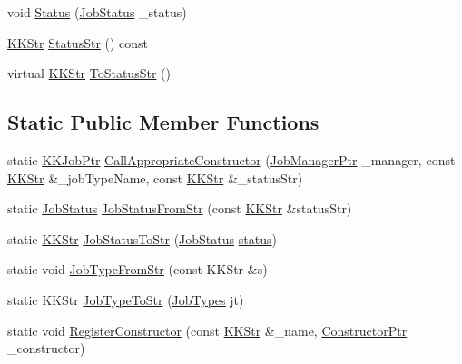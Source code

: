\begin{DoxyCompactItemize}
\item 
void \hyperlink{class_k_k_job_managment_1_1_k_k_job_ad21e08efa5fbb8a71f53accbb43fdeba}{Status} (\hyperlink{class_k_k_job_managment_1_1_k_k_job_afbd631ac794da7bbb00e0406ba89bac4}{Job\+Status} \+\_\+status)
\item 
\hyperlink{class_k_k_b_1_1_k_k_str}{K\+K\+Str} \hyperlink{class_k_k_job_managment_1_1_k_k_job_a203c289689cede5da9e838c51bd8bed9}{Status\+Str} () const 
\item 
virtual \hyperlink{class_k_k_b_1_1_k_k_str}{K\+K\+Str} \hyperlink{class_k_k_job_managment_1_1_k_k_job_ade700f55c6f680e24bcd9cb9c705c126}{To\+Status\+Str} ()
\end{DoxyCompactItemize}
\subsection*{Static Public Member Functions}
\begin{DoxyCompactItemize}
\item 
static \hyperlink{class_k_k_job_managment_1_1_k_k_job_a53526e4ffe4ab2b7858f79ab0ed65a1d}{K\+K\+Job\+Ptr} \hyperlink{class_k_k_job_managment_1_1_k_k_job_a3dbb74854fbdf42833ebde21f2f44498}{Call\+Appropriate\+Constructor} (\hyperlink{namespace_k_k_job_managment_aa12a7270f9983ca4ed916533dc8adbc4}{Job\+Manager\+Ptr} \+\_\+manager, const \hyperlink{class_k_k_b_1_1_k_k_str}{K\+K\+Str} \&\+\_\+job\+Type\+Name, const \hyperlink{class_k_k_b_1_1_k_k_str}{K\+K\+Str} \&\+\_\+status\+Str)
\item 
static \hyperlink{class_k_k_job_managment_1_1_k_k_job_afbd631ac794da7bbb00e0406ba89bac4}{Job\+Status} \hyperlink{class_k_k_job_managment_1_1_k_k_job_a14afdfc32455f894f755ff3f19bccf15}{Job\+Status\+From\+Str} (const \hyperlink{class_k_k_b_1_1_k_k_str}{K\+K\+Str} \&status\+Str)
\item 
static \hyperlink{class_k_k_b_1_1_k_k_str}{K\+K\+Str} \hyperlink{class_k_k_job_managment_1_1_k_k_job_acadc3580a42ad9e5d6684a60146c2b62}{Job\+Status\+To\+Str} (\hyperlink{class_k_k_job_managment_1_1_k_k_job_afbd631ac794da7bbb00e0406ba89bac4}{Job\+Status} \hyperlink{class_k_k_job_managment_1_1_k_k_job_a7d47b57d658db4208037511f7f663be9}{status})
\item 
static void \hyperlink{class_k_k_job_managment_1_1_k_k_job_a739e57abc4809b2b6822aa82f3b896c9}{Job\+Type\+From\+Str} (const K\+K\+Str \&s)
\item 
static K\+K\+Str \hyperlink{class_k_k_job_managment_1_1_k_k_job_aa687684d2d9691d9769e259ce24fbbac}{Job\+Type\+To\+Str} (\hyperlink{class_k_k_job_managment_1_1_k_k_job_acb39124f5d31008eba2476942ff0752a}{Job\+Types} jt)
\item 
static void \hyperlink{class_k_k_job_managment_1_1_k_k_job_a48f71d0c1e621497caa1315c7a1d37a5}{Register\+Constructor} (const \hyperlink{class_k_k_b_1_1_k_k_str}{K\+K\+Str} \&\+\_\+name, \hyperlink{class_k_k_job_managment_1_1_k_k_job_aaa663a535573601302dd8bc1ead56485}{Constructor\+Ptr} \+\_\+constructor)
\end{DoxyCompactItemize}
